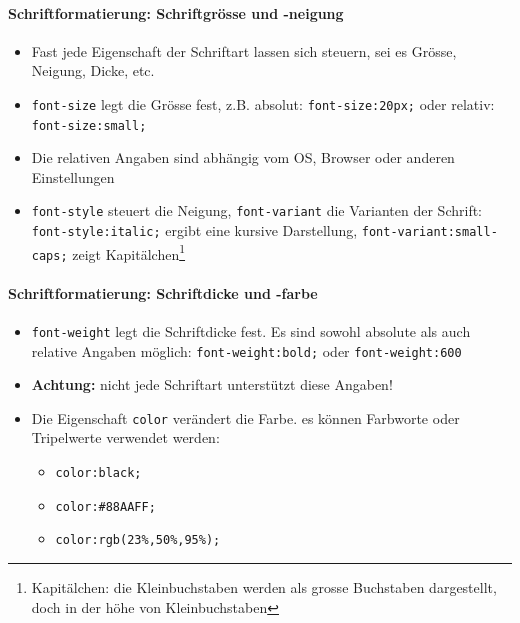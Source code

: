 \documentclass[10pt,a4paper]{article}
\begin{document}
\paragraph{Schriftformatierung: Schriftgrösse und -neigung}
\begin{itemize}[noitemsep,topsep=0pt,leftmargin=*]
    \item Fast jede Eigenschaft der Schriftart lassen sich steuern, sei es Grösse, Neigung, Dicke, etc.
    \item \texttt{font-size} legt die Grösse fest, z.B. absolut: \texttt{font-size:20px;} oder relativ: \texttt{font-size:small;}
    \item Die relativen Angaben sind abhängig vom OS, Browser oder anderen Einstellungen
    \item \texttt{font-style} steuert die Neigung, \texttt{font-variant} die Varianten der Schrift: \texttt{font-style:italic;} ergibt eine kursive Darstellung, \texttt{font-variant:small-caps;} zeigt Kapitälchen\footnote{Kapitälchen: die Kleinbuchstaben werden als grosse Buchstaben dargestellt, doch in der höhe von Kleinbuchstaben}
\end{itemize}

\paragraph{Schriftformatierung: Schriftdicke und -farbe}
\begin{itemize}[noitemsep,topsep=0pt,leftmargin=*]
    \item \texttt{font-weight} legt die Schriftdicke fest. Es sind sowohl absolute als auch relative Angaben möglich: \texttt{font-weight:bold;} oder \texttt{font-weight:600}
    \item \textbf{Achtung:} nicht jede Schriftart unterstützt diese Angaben!
    \item Die Eigenschaft \texttt{color} verändert die Farbe. es können Farbworte oder Tripelwerte verwendet werden:
    \begin{itemize}[noitemsep,topsep=0pt,leftmargin=*]
        \item \texttt{color:black;}
        \item \texttt{color:\#88AAFF;}
        \item \texttt{color:rgb(23\%,50\%,95\%);}
    \end{itemize}
\end{itemize}
\end{document}
